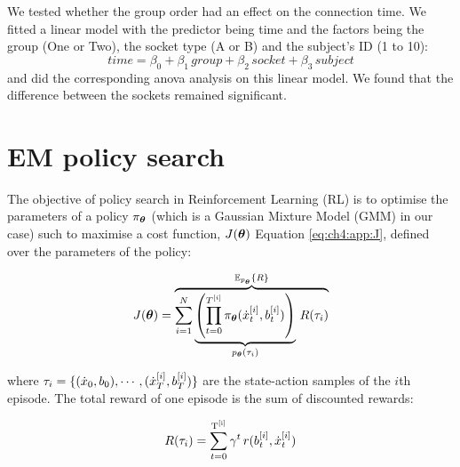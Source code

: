 \begin{appendices}
We tested whether the group order had an effect on the connection time. We fitted a linear model
with the predictor being time and the factors being the group (One or Two), the socket type (A or B) 
and the subject's ID (1 to 10):
\begin{equation}
 time = \beta_0 + \beta_1\, group + \beta_2\, socket + \beta_3\, subject
\end{equation}
and did the corresponding anova analysis on this linear model. We found that the difference between the sockets 
remained significant.
\FloatBarrier
\section{EM policy search}\label{app:lb}
The objective of policy search in Reinforcement Learning (RL) is to optimise the parameters of a policy $\pi_{\boldsymbol{\theta}}$
(which is a Gaussian Mixture Model (GMM) in our case) such to maximise a cost 
function, $J(\boldsymbol{\theta})$ Equation \ref{eq:ch4:app:J}, defined over the parameters of the policy:


\begin{align}\label{eq:ch4:app:J}
 J(\boldsymbol{\theta}) = \overbrace{\sum\limits_{i=1}^{N}   \underbrace{\left( \prod_{t=0}^{T^{[i]}} \pi_{\boldsymbol{\theta}}(\dot{x}^{[i]}_t,b^{[i]}_t) \right)}_{p_{\boldsymbol{\theta}}(\tau_i)} \, R(\tau_i)}^{\mathbb{E}_{p_{\boldsymbol{\theta}}}\{R\}} 
\end{align}

where $\tau_i = \{(\dot{x}_0,b_0),\cdots,(\dot{x}_T^{[i]},b_T^{[i]}) \}$ are the state-action samples of the $i$th episode. 
The total reward of one episode is the sum of discounted rewards:

\begin{equation}
 R(\tau_i) = \sum_{t=0}^{\mathrm{T^{[i]}}} \gamma^t \, r(b^{[i]}_t,\dot{x}^{[i]}_t)
\end{equation}


\end{appendices}
